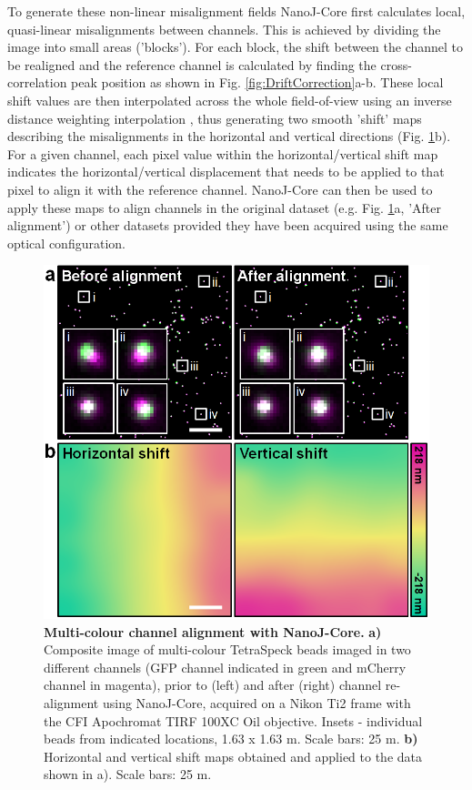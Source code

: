  To generate these non-linear misalignment fields NanoJ-Core first calculates local, quasi-linear misalignments between channels. This is achieved by dividing the image into small areas ('blocks'). For each block, the shift between the channel to be realigned and the reference channel is calculated by finding the cross-correlation peak position as shown in Fig. \ref{fig:DriftCorrection}a-b. These local shift values are then  interpolated across the whole field-of-view using an inverse distance weighting interpolation \cite{shepard1968two}, thus generating two smooth 'shift' maps describing the misalignments in the horizontal and vertical directions (Fig. \ref{fig:ChannelAlignment}b). For a given channel, each pixel value within the horizontal/vertical shift map indicates the horizontal/vertical displacement that needs to be applied to that pixel to align it with the reference channel. NanoJ-Core can then be used to apply these maps to align channels in the original dataset (e.g. Fig. \ref{fig:ChannelAlignment}a, 'After alignment') or other datasets provided they have been acquired using the same optical configuration.
 
 \begin{figure}[!t]
    \centering
    \includegraphics[width=\linewidth]{Figures/FigureChannelAlignment_v4.png}
    \caption{\textbf{Multi-colour channel alignment with NanoJ-Core.} \textbf{a)} Composite image of multi-colour TetraSpeck beads imaged in two different channels (GFP channel indicated in green and mCherry channel in magenta), prior to (left) and after (right) channel re-alignment using NanoJ-Core, acquired on a Nikon Ti2 frame with the CFI Apochromat TIRF 100XC Oil objective. Insets - individual beads from indicated locations, 1.63 x 1.63 \micro m. Scale bars: 25 \micro m. \textbf{b)} Horizontal and vertical shift maps obtained and applied to the data shown in a). Scale bars: 25 \micro m.}
    \label{fig:ChannelAlignment}
\end{figure}
 
